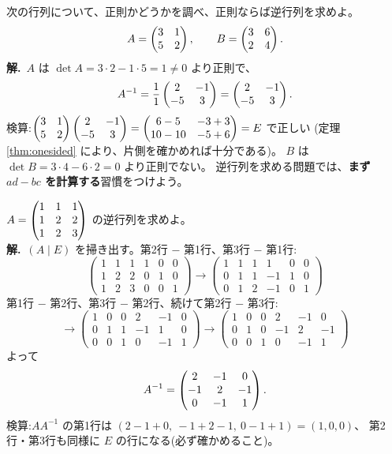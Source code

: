 \begin{rei}[例題・基本(公式で求める)]
次の行列について、正則かどうかを調べ、正則ならば逆行列を求めよ。
\[
A = \begin{pmatrix}3 & 1 \\ 5 & 2\end{pmatrix}, \qquad B = \begin{pmatrix}3 & 6 \\ 2 & 4\end{pmatrix}.
\]
\textbf{解.}\ $A$ は $\det A = 3 \cdot 2 - 1 \cdot 5 = 1 \neq 0$ より正則で、
\[
A^{-1} = \frac{1}{1}\begin{pmatrix}2 & -1 \\ -5 & 3\end{pmatrix} = \begin{pmatrix}2 & -1 \\ -5 & 3\end{pmatrix}.
\]
検算:$\begin{pmatrix}3 & 1 \\ 5 & 2\end{pmatrix}\begin{pmatrix}2 & -1 \\ -5 & 3\end{pmatrix}
= \begin{pmatrix}6 - 5 & -3 + 3 \\ 10 - 10 & -5 + 6\end{pmatrix} = E$ で正しい
(定理 \ref{thm:onesided} により、片側を確かめれば十分である)。
$B$ は $\det B = 3 \cdot 4 - 6 \cdot 2 = 0$ より正則でない。
逆行列を求める問題では、\textbf{まず $ad - bc$ を計算する}習慣をつけよう。
\end{rei}

\begin{rei}[例題・基本($3$ 次を掃き出しで)]\label{rei:inv-gauss3}
$A = \begin{pmatrix}1 & 1 & 1 \\ 1 & 2 & 2 \\ 1 & 2 & 3\end{pmatrix}$ の逆行列を求めよ。\\
\textbf{解.}\ $(A \mid E)$ を掃き出す。第2行 $-$ 第1行、第3行 $-$ 第1行:
\[
\left(\begin{array}{ccc|ccc}
1 & 1 & 1 & 1 & 0 & 0 \\
1 & 2 & 2 & 0 & 1 & 0 \\
1 & 2 & 3 & 0 & 0 & 1
\end{array}\right)
\longrightarrow
\left(\begin{array}{ccc|ccc}
1 & 1 & 1 & 1 & 0 & 0 \\
0 & 1 & 1 & -1 & 1 & 0 \\
0 & 1 & 2 & -1 & 0 & 1
\end{array}\right)
\]
第1行 $-$ 第2行、第3行 $-$ 第2行、続けて第2行 $-$ 第3行:
\[
\longrightarrow
\left(\begin{array}{ccc|ccc}
1 & 0 & 0 & 2 & -1 & 0 \\
0 & 1 & 1 & -1 & 1 & 0 \\
0 & 0 & 1 & 0 & -1 & 1
\end{array}\right)
\longrightarrow
\left(\begin{array}{ccc|ccc}
1 & 0 & 0 & 2 & -1 & 0 \\
0 & 1 & 0 & -1 & 2 & -1 \\
0 & 0 & 1 & 0 & -1 & 1
\end{array}\right)
\]
よって
\[
A^{-1} = \begin{pmatrix}2 & -1 & 0 \\ -1 & 2 & -1 \\ 0 & -1 & 1\end{pmatrix}.
\]
検算:$AA^{-1}$ の第1行は $(2 - 1 + 0,\ -1 + 2 - 1,\ 0 - 1 + 1) = (1, 0, 0)$、
第2行・第3行も同様に $E$ の行になる(必ず確かめること)。
\end{rei}

